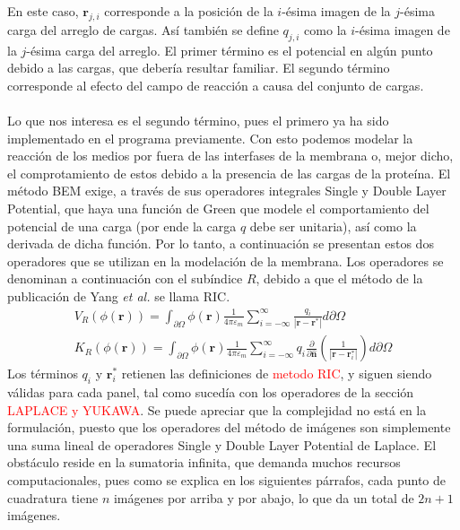 \documentclass[12pt, oneside, numbers, spanish]{ezthesis}
\numberwithin{equation}{section}
\begin{document}
En este caso, $\mathbf{r}_{j,i}$ corresponde a la posición de la $i$-ésima imagen de la $j$-ésima carga del arreglo de cargas. Así también se define $q_{j,i}$ como la $i$-ésima imagen de la $j$-ésima carga del arreglo. El primer término es el potencial en algún punto debido a las cargas, que debería resultar familiar. El segundo término corresponde al efecto del campo de reacción a causa del conjunto de cargas.\\\\
Lo que nos interesa es el segundo término, pues el primero ya ha sido implementado en el programa previamente. Con esto podemos modelar la reacción de los medios por fuera de las interfases de la membrana o, mejor dicho, el comprotamiento de estos debido a la presencia de las cargas de la proteína. El método BEM exige, a través de sus operadores integrales Single y Double Layer Potential, que haya una función de Green que modele el comportamiento del potencial de una carga (por ende la carga $q$ debe ser unitaria), así como la derivada de dicha función. Por lo tanto, a continuación se presentan estos dos operadores que se utilizan en la modelación de la membrana. Los operadores se denominan a continuación con el subíndice $R$, debido a que el método de la publicación de Yang \textit{et al.} se llama RIC.
\begin{align}
V_R(\phi(\mathbf{r})) = \int_{\partial\Omega}\phi(\mathbf{r})\frac{1}{4\pi\varepsilon_m}\sum_{i=-\infty}^{\infty}\frac{q_i}{|\mathbf{r} - \mathbf{r}^*|}d\partial\Omega \label{eqn:SLOp_Memb}\\
K_R(\phi(\mathbf{r})) = \int_{\partial\Omega}\phi(\mathbf{r})\frac{1}{4\pi\varepsilon_m}\sum_{i=-\infty}^{\infty}q_i\frac{\partial}{\partial\hat{\mathbf{n}}}\left(\frac{1}{|\mathbf{r} - \mathbf{r}_i^*|}\right)d\partial\Omega \label{eqn:DLOp_Memb}
\end{align}
Los términos $q_i$ y $\mathbf{r}_i^*$ retienen las definiciones de \textcolor{red}{metodo RIC}, y siguen siendo válidas para cada panel, tal como sucedía con los operadores de la sección \textcolor{red}{LAPLACE y YUKAWA}. Se puede apreciar que la complejidad no está en la formulación, puesto que los operadores del método de imágenes son simplemente una suma lineal de operadores Single y Double Layer Potential de Laplace. El obstáculo reside en la sumatoria infinita, que demanda muchos recursos computacionales, pues como se explica en los siguientes párrafos, cada punto de cuadratura tiene $n$ imágenes por arriba y por abajo, lo que da un total de $2n + 1$ imágenes.
\end{document}
